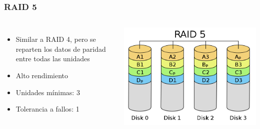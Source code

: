 \documentclass[aspectratio=169]{beamer}
\begin{document}
\begin{frame}
  \frametitle{RAID 5}
  \begin{columns}
    \begin{itemize}
    \item Similar a RAID 4, pero se reparten los datos de paridad
      entre todas las unidades
    \item Alto rendimiento
    \item Unidades mínimas: 3
    \item Tolerancia a fallos: 1
    \end{itemize}
    \includegraphics[width=\textwidth]{img/RAID5}
  \end{columns}
  
\end{frame}
\end{document}
